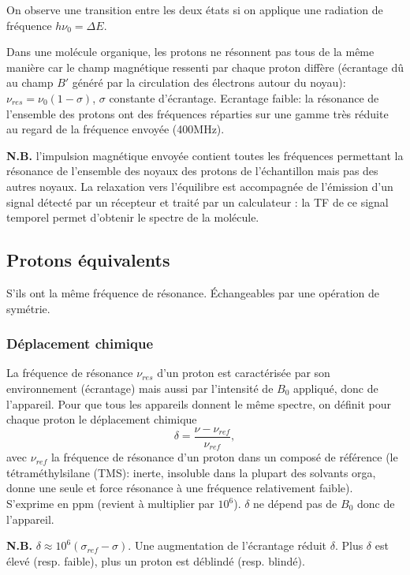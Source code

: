 \documentclass[11pt]{report}
\numberwithin{figure}{section}
\numberwithin{equation}{section}
\numberwithin{table}{section}
\newcommand{\1}{\boldsymbol{1}}
\begin{document}
On observe une transition entre les deux états si on applique une radiation de fréquence $h \nu_0 = \Delta E$.

Dans une molécule organique, les protons ne résonnent pas tous de la même manière car le champ magnétique ressenti par chaque proton diffère (écrantage dû au champ $B'$ généré par la circulation des électrons autour du noyau): $\nu_{res} = \nu_0 (1-\sigma)$, $\sigma$ constante d'écrantage. Ecrantage faible: la résonance de l'ensemble des protons ont des fréquences réparties sur une gamme très réduite au regard de la fréquence envoyée (400MHz).

\textbf{N.B.} l'impulsion magnétique envoyée contient toutes les fréquences permettant la résonance de l'ensemble des noyaux des protons de l'échantillon mais pas des autres noyaux. La relaxation vers l'équilibre est accompagnée de l'émission d'un signal détecté par un récepteur et traité par un calculateur : la TF de ce signal temporel permet d'obtenir le spectre de la molécule.


\subsection{Protons équivalents}

S'ils ont la même fréquence de résonance. Échangeables par une opération de symétrie.

\subsubsection{Déplacement chimique}

La fréquence de résonance $\nu_{res}$ d'un proton est caractérisée par son environnement (écrantage) mais aussi par l'intensité de $B_0$ appliqué, donc de l'appareil. Pour que tous les appareils donnent le même spectre, on définit pour chaque proton le déplacement chimique 
\begin{equation}
\delta = \frac{\nu - \nu_{ref}}{\nu_{ref}},
\end{equation}
avec $\nu_{ref}$ la fréquence de résonance d'un proton dans un composé de référence (le tétraméthylsilane (TMS): inerte, insoluble dans la plupart des solvants orga, donne une seule et force résonance à une fréquence relativement faible). S'exprime en ppm (revient à multiplier par $10^6$). $\delta$ ne dépend pas de $B_0$ donc de l'appareil.

\textbf{N.B.} $\delta \approx 10^6 (\sigma_{ref} - \sigma)$. Une augmentation de l'écrantage réduit $\delta$. Plus $\delta$ est élevé (resp. faible), plus un proton est déblindé (resp. blindé).
\end{document}
